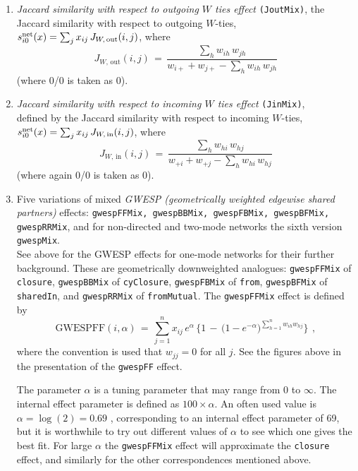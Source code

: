 \documentclass[a4paper,fleqn,11pt]{article}
\newcommand{\+}{\, + \,}
\newcommand{\vit}{\theenumi}
\newcounter{savenumi}
\begin{document}
\begin{enumerate}
\setcounter{enumi}{\value{savenumi}}
 \item {\em Jaccard similarity with respect to outgoing $W$ ties effect} \texttt{(JoutMix)},
 the Jaccard similarity with respect to outgoing $W$-ties,\\
 $s^{\rm net}_{i\vit}(x) =  \sum_j x_{ij} \, J_{W,\, \text{out}}(i,j)$, where
 \[
 J_{W,\, \text{out}}(i,j) \,=\, \frac{\sum_h w_{ih}\,w_{jh}}
                     {w_{i+} + w_{j+} - \sum_h w_{ih}\,w_{jh}}
 \]
 (where 0/0 is taken as 0).

 \item {\em Jaccard similarity with respect to incoming $W$ ties effect} \texttt{(JinMix)},\\
 defined by
 the Jaccard similarity with respect to incoming $W$-ties,\\
 $s^{\rm net}_{i\vit}(x) =  \sum_j x_{ij} \, J_{W,\, \text{in}}(i,j)$, where
 \[
 J_{W,\, \text{in}}(i,j) \,=\, \frac{\sum_h w_{hi}\,w_{hj}}
                     {w_{+i} + w_{+j} - \sum_h w_{hi}\,w_{hj}}
 \]
 (where again 0/0 is taken as 0).

 \item Five variations of mixed \emph{GWESP (geometrically weighted edgewise
  shared partners)} effects: \texttt{gwespFFMix, gwespBBMix,
  gwespFBMix, gwespBFMix, gwespRRMix}, and for non-directed
  and two-mode networks the sixth version \texttt{gwespMix}. \\
  See above for the GWESP effects for one-mode networks for their
  further background.
  These are geometrically downweighted analogues:
   \texttt{gwespFFMix} of \texttt{closure},
   \texttt{gwespBBMix} of \texttt{cyClosure},
  \texttt{gwespFBMix} of \texttt{from}, \texttt{gwespBFMix} of \texttt{sharedIn},
  and \texttt{gwespRRMix} of \texttt{fromMutual}.
  The \texttt{gwespFFMix} effect is defined by
\[
  \text{GWESPFF}(i, \alpha) \,=\,
       \sum_{j=1}^n x_{ij} \,
                        e^{\alpha} \,\Big\{1 \,-\, \big(1 -
                        e^{-\alpha}\big)^{\sum_{h=1}^n w_{ih}w_{hj} }  \Big\}
      \,   \ ,
\]
where the convention is used that $w_{jj} = 0$ for all $j$.
See the figures above in the presentation of the \texttt{gwespFF}
effect.

The parameter $\alpha$ is a tuning parameter that may range from 0 to $\infty$.
The internal effect parameter is defined as $100 \times \alpha$.
An often used value is $\alpha = \log(2) = 0.69$ \citep{SPRH06},
corresponding to an internal effect parameter of 69,
but it is worthwhile to try out different values of $\alpha$
to see which one gives the best fit.
For large $\alpha$ the  \texttt{gwespFFMix} effect will
approximate the \texttt{closure} effect, and similarly for the
other correspondences mentioned above.


\end{enumerate}
\end{document}

